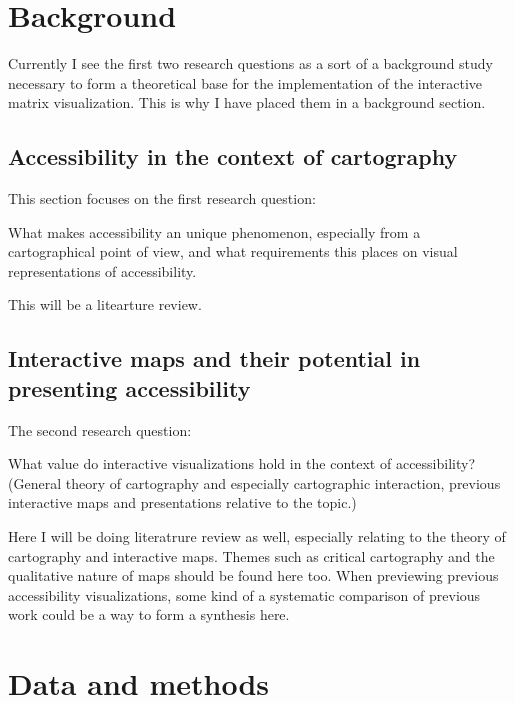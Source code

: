 \documentclass[12pt]{article}
\begin{document}
\section{Background}

Currently I see the first two research questions as a sort of a background study
necessary to form a theoretical base
for the implementation of the interactive matrix visualization.
This is why I have placed them in a background section.

\subsection{Accessibility in the context of cartography}
This section focuses on the first research question:

\begin{displayquote}
What makes accessibility an unique phenomenon,
especially from a cartographical point of view,
and what requirements this places on visual representations of accessibility.
\end{displayquote}

This will be a litearture review.

\subsection{Interactive maps and their potential in presenting accessibility}
The second research question:

\begin{displayquote}
What value do interactive visualizations hold in the context of accessibility?
(General theory of cartography and especially cartographic interaction,
previous interactive maps and presentations relative to the topic.)
\end{displayquote}

Here I will be doing literatrure review as well,
especially relating to the theory of cartography and interactive maps.
Themes such as critical cartography
and the qualitative nature of maps should be found here too.
When previewing previous accessibility visualizations,
some kind of a systematic comparison of previous work
could be a way to form a synthesis here.

\section{Data and methods}
\end{document}

